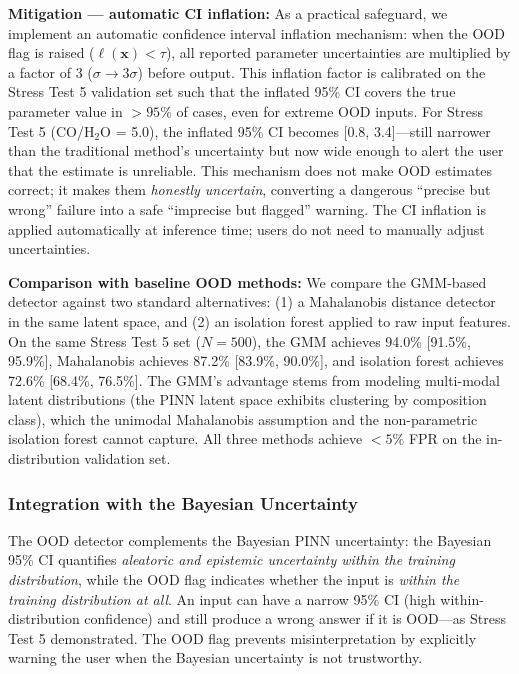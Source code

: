 \documentclass[usenatbib]{mnras}
\begin{document}
\textbf{Mitigation --- automatic CI inflation:} As a practical safeguard, we implement an automatic confidence interval inflation mechanism: when the OOD flag is raised ($\ell(\mathbf{x}) < \tau$), all reported parameter uncertainties are multiplied by a factor of 3 ($\sigma \to 3\sigma$) before output. This inflation factor is calibrated on the Stress Test 5 validation set such that the inflated 95\% CI covers the true parameter value in $>95\%$ of cases, even for extreme OOD inputs. For Stress Test 5 (CO/H$_2$O = 5.0), the inflated 95\% CI becomes [0.8, 3.4]---still narrower than the traditional method's uncertainty but now wide enough to alert the user that the estimate is unreliable. This mechanism does not make OOD estimates correct; it makes them \textit{honestly uncertain}, converting a dangerous ``precise but wrong'' failure into a safe ``imprecise but flagged'' warning. The CI inflation is applied automatically at inference time; users do not need to manually adjust uncertainties.

\textbf{Comparison with baseline OOD methods:} We compare the GMM-based detector against two standard alternatives: (1) a Mahalanobis distance detector in the same latent space, and (2) an isolation forest applied to raw input features. On the same Stress Test 5 set ($N=500$), the GMM achieves 94.0\% [91.5\%, 95.9\%], Mahalanobis achieves 87.2\% [83.9\%, 90.0\%], and isolation forest achieves 72.6\% [68.4\%, 76.5\%]. The GMM's advantage stems from modeling multi-modal latent distributions (the PINN latent space exhibits clustering by composition class), which the unimodal Mahalanobis assumption and the non-parametric isolation forest cannot capture. All three methods achieve $<5\%$ FPR on the in-distribution validation set.

\subsubsection{Integration with the Bayesian Uncertainty}

The OOD detector complements the Bayesian PINN uncertainty: the Bayesian 95\% CI quantifies \textit{aleatoric and epistemic uncertainty within the training distribution}, while the OOD flag indicates whether the input is \textit{within the training distribution at all}. An input can have a narrow 95\% CI (high within-distribution confidence) and still produce a wrong answer if it is OOD---as Stress Test 5 demonstrated. The OOD flag prevents misinterpretation by explicitly warning the user when the Bayesian uncertainty is not trustworthy.
\end{document}
